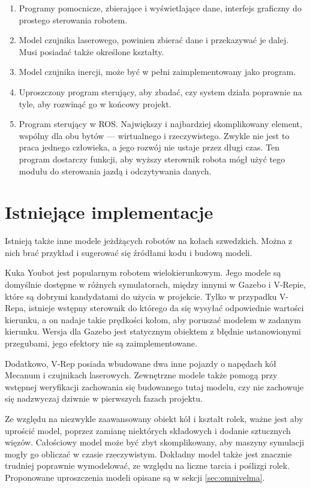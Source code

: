 \begin{enumerate}
	\item Programy pomocnicze, zbierające i wyświetlające dane, interfejs graficzny do prostego sterowania robotem.
	\item Model czujnika laserowego, powinien zbierać dane i przekazywać je dalej. Musi posiadać także określone kształty.
	\item Model czujnika inercji, może być w pełni zaimplementowany jako program.
	\item Uproszczony program sterujący, aby zbadać, czy system działa poprawnie na tyle, aby rozwinąć go w końcowy projekt.
	\item Program sterujący w ROS. Największy i najbardziej skomplikowany element, wspólny dla obu bytów --- wirtualnego i rzeczywistego.
	Zwykle nie jest to praca jednego człowieka, a jego rozwój nie ustaje przez długi czas.
	Ten program dostarczy funkcji, aby wyższy sterownik robota mógł użyć tego modułu do sterowania jazdą i odczytywania danych.
	\end{enumerate}
	
\section{Istniejące implementacje}
	Istnieją także inne modele jeżdżących robotów na kołach szwedzkich.
	Można z nich brać przykład i sugerować się źródłami kodu i budową modeli.

	Kuka Youbot jest popularnym robotem wielokierunkowym. Jego modele są domyślnie dostępne w różnych symulatorach, między innymi w Gazebo i V-Repie, które są dobrymi kandydatami do 
	użycia w projekcie.
	Tylko w przypadku V-Repa, istnieje wstępny sterownik do którego da się wysyłać odpowiednie wartości kierunku, a on nadaje takie prędkości kołom, aby poruszać modelem w zadanym kierunku.
	Wersja dla Gazebo jest statycznym obiektem z błędnie ustanowionymi przegubami, jego efektory nie są zaimplementowane.
	
	Dodatkowo, V-Rep posiada wbudowane dwa inne pojazdy o napędach kół Mecanum i czujnikach laserowych.
	Zewnętrzne modele także pomogą przy wstępnej weryfikacji zachowania się budowanego tutaj modelu, czy nie zachowuje się nadzwyczaj dziwnie w pierwszych fazach projektu.

	Ze względu na niezwykle zaawansowany obiekt kół i kształt rolek, ważne jest aby uprościć model, poprzez zamianę niektórych składowych i dodanie sztucznych więzów.
	Całościowy model może być zbyt skomplikowany, aby maszyny symulacji mogły go obliczać w czasie rzeczywistym.
	Dokładny model także jest znacznie trudniej poprawnie wymodelować, ze względu na liczne tarcia i poślizgi rolek.
	Proponowane uproszczenia modeli opisane są w sekcji \ref{sec:omnivelma}.
	
